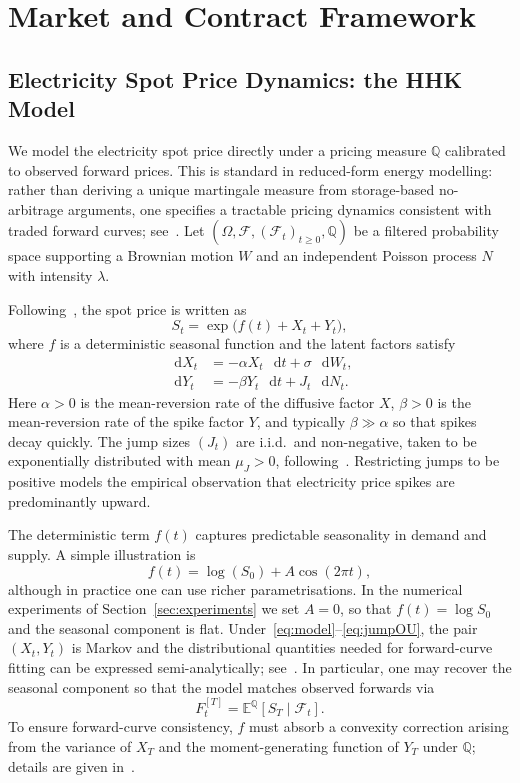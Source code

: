 \documentclass[a4paper,fleqn]{cas-dc}
\newcommand*\D{\mathop{}\!\mathrm{d}}
\begin{document}
\section{Market and Contract Framework}
\label{sec:market_contract}

\subsection{Electricity Spot Price Dynamics: the HHK Model}

We model the electricity spot price directly under a pricing measure $\mathbb{Q}$ calibrated to observed forward prices. This is standard in reduced-form energy modelling: rather than deriving a unique martingale measure from storage-based no-arbitrage arguments, one specifies a tractable pricing dynamics consistent with traded forward curves; see~\cite{lucia2002electricity,cartea2005pricing,Hambly2009}. Let $(\Omega,\mathcal{F},(\mathcal{F}_t)_{t \ge 0},\mathbb{Q})$ be a filtered probability space supporting a Brownian motion $W$ and an independent Poisson process $N$ with intensity $\lambda$.

Following~\cite{Hambly2009}, the spot price is written as
\begin{equation}
    \label{eq:model}
    S_t = \exp\!\bigl(f(t) + X_t + Y_t\bigr),
\end{equation}
where $f$ is a deterministic seasonal function and the latent factors satisfy
\begin{align}
    \D X_t & = -\alpha X_t \,\D t + \sigma \,\D W_t, \label{eq:OU} \\
    \D Y_t & = -\beta Y_t \,\D t + J_t \,\D N_t. \label{eq:jumpOU}
\end{align}
Here $\alpha > 0$ is the mean-reversion rate of the diffusive factor $X$, $\beta > 0$ is the mean-reversion rate of the spike factor $Y$, and typically $\beta \gg \alpha$ so that spikes decay quickly. The jump sizes $(J_t)$ are i.i.d.\ and non-negative, taken to be exponentially distributed with mean $\mu_J > 0$, following~\cite{Hambly2009,cartea2005pricing}. Restricting jumps to be positive models the empirical observation that electricity price spikes are predominantly upward.

The deterministic term $f(t)$ captures predictable seasonality in demand and supply. A simple illustration is
\[
    f(t) = \log(S_0) + A \cos(2 \pi t),
\]
although in practice one can use richer parametrisations. In the numerical experiments of Section~\ref{sec:experiments} we set $A = 0$, so that $f(t) = \log S_0$ and the seasonal component is flat. Under~\eqref{eq:model}--\eqref{eq:jumpOU}, the pair $(X_t,Y_t)$ is Markov and the distributional quantities needed for forward-curve fitting can be expressed semi-analytically; see~\cite{Hambly2009}. In particular, one may recover the seasonal component so that the model matches observed forwards via
\[
    F_t^{[T]} = \mathbb{E}^{\mathbb{Q}}[S_T \mid \mathcal{F}_t].
\]
To ensure forward-curve consistency, $f$ must absorb a convexity correction arising from the variance of $X_T$ and the moment-generating function of $Y_T$ under $\mathbb{Q}$; details are given in~\cite{Hambly2009}.
\end{document}
